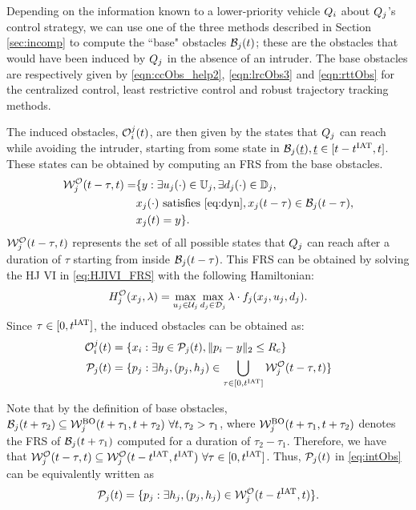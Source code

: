 Depending on the information known to a lower-priority vehicle $Q_i$ about $Q_j$'s control strategy, we can use one of the three methods described in Section \ref{sec:incomp} to compute the ``base" obstacles $\mathcal{B}_j(t)$; these are the obstacles that would have been induced by $Q_j$ in the absence of an intruder. The base obstacles are respectively given by \eqref{eqn:ccObs_help2}, \eqref{eqn:lrcObs3} and \eqref{eqn:rttObs} for the centralized control, least restrictive control and robust trajectory tracking methods.

The induced obstacles, $\mathcal{O}_i^j(t)$, are then given by the states that $Q_j$ can reach while avoiding the intruder, starting from some state in $\mathcal{B}_j(\underline{t}), \underline{t} \in [t-t^\text{IAT}, t]$. These states can be obtained by computing an FRS from the base obstacles.
\begin{equation} \label{eq:FRS_intObs1}
\begin{aligned}
\frs_{j}^{\mathcal{O}}(t-\tau, t) = & \{y: \exists \ctrl_j(\cdot) \in \cfset_j, \exists \dstb_j(\cdot) \in \dfset_j, \\
& \state_j(\cdot) \text{ satisfies \eqref{eq:dyn}}, \state_j(t-\tau) \in \boset_j(t-\tau), \\
& \state_j(t) = y\}.
\end{aligned}
\end{equation}
$\mathcal{W}_{j}^{\mathcal{O}}(t-\tau, t)$ represents the set of all possible states that $Q_j$ can reach after a duration of $\tau$ starting from inside $\mathcal{B}_j(t-\tau)$. This FRS can be obtained by solving the HJ VI in \eqref{eq:HJIVI_FRS} with the following Hamiltonian:
\begin{equation}
\ham_{j}^{\mathcal{O}}(\state_j, \costate) = \max_{\ctrl_j \in \cset_j} \max_{\dstb_j \in \dset_j} \costate \cdot f_j (\state_j, \ctrl_j, \dstb_j) \label{intobs2}.
\end{equation} 
Since $\tau \in [0, t^\text{IAT}]$, the induced obstacles can be obtained as:
\begin{equation} \label{eq:intObs}
\begin{aligned}
\ioset_i^j(t) & = \{\state_i: \exists y \in \pfrs_j(t), \|\pos_i - y\|_2 \le \rc \}\\
\pfrs_j(t) & = \{p_j: \exists \npos_j, (p_j, \npos_j) \in \bigcup_{\tau \in [0, \iat]} \frs_{j}^{\mathcal{O}}(t-\tau, t) \}
\end{aligned}
\end{equation}

Note that by the definition of base obstacles, $\mathcal{B}_j(t+\tau_2) \subseteq \mathcal{W}_{j}^{\text{BO}}(t+\tau_1, t+\tau_2) ~\forall t, \tau_2 > \tau_1$, where $\mathcal{W}_{j}^{\text{BO}}(t+\tau_1, t+\tau_2)$ denotes the FRS of $\mathcal{B}_j(t+\tau_1)$ computed for a duration of $\tau_2-\tau_1$. Therefore, we have that $\mathcal{W}_{j}^{\mathcal{O}}(t-\tau, t) \subseteq \mathcal{W}_{j}^{\mathcal{O}}(t-t^\text{IAT}, t^\text{IAT}) ~\forall \tau \in [0, t^\text{IAT}]$. Thus, $\mathcal{P}_j(t)$ in \eqref{eq:intObs} can be equivalently written as
\begin{equation} \label{eq:intObs_help1}
\pfrs_j(t) = \{p_j: \exists \npos_j, (p_j, \npos_j) \in \frs_{j}^{\mathcal{O}}(t-\iat, t) \}.
\end{equation}

